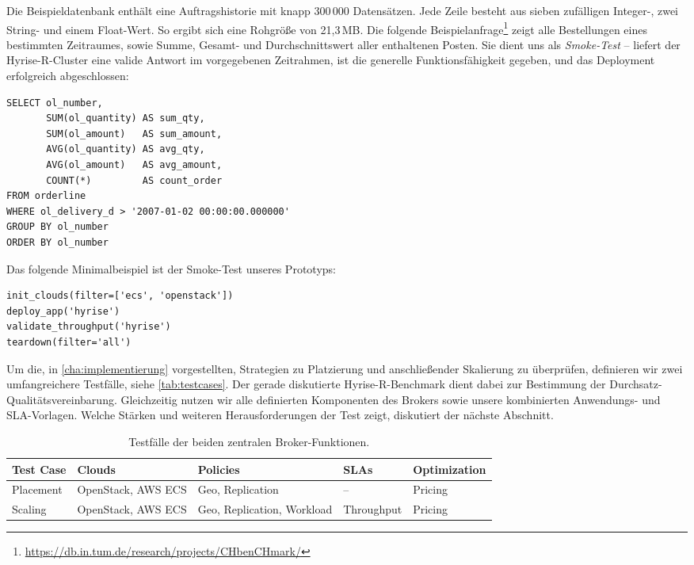 Die Beispieldatenbank enthält eine Auftragshistorie mit knapp 300\,000 Datensätzen. Jede Zeile besteht aus sieben zufälligen Integer-, zwei String- und einem Float-Wert. So ergibt sich eine Rohgröße von 21,3\,MB. Die folgende Beispielanfrage\footnote{\url{https://db.in.tum.de/research/projects/CHbenCHmark/}} zeigt alle Bestellungen eines bestimmten Zeitraumes, sowie Summe, Gesamt- und Durchschnittswert aller enthaltenen Posten. Sie dient uns als \emph{Smoke-Test} -- liefert der Hyrise-R-Cluster eine valide Antwort im vorgegebenen Zeitrahmen, ist die generelle Funktionsfähigkeit gegeben, und das Deployment erfolgreich abgeschlossen:

\begin{verbatim}
SELECT ol_number,
       SUM(ol_quantity) AS sum_qty,
       SUM(ol_amount)   AS sum_amount,
       AVG(ol_quantity) AS avg_qty,
       AVG(ol_amount)   AS avg_amount,
       COUNT(*)         AS count_order
FROM orderline 
WHERE ol_delivery_d > '2007-01-02 00:00:00.000000' 
GROUP BY ol_number
ORDER BY ol_number
\end{verbatim}


\noindent
Das folgende Minimalbeispiel ist der Smoke-Test unseres Prototyps:
\begin{verbatim}
init_clouds(filter=['ecs', 'openstack'])
deploy_app('hyrise')
validate_throughput('hyrise')
teardown(filter='all')
\end{verbatim}

\noindent
Um die, in \autoref{cha:implementierung} vorgestellten, Strategien zu Platzierung und anschließender Skalierung zu überprüfen, definieren wir zwei umfangreichere Testfälle, siehe \autoref{tab:testcases}. Der gerade diskutierte Hyrise-R-Benchmark dient dabei zur Bestimmung der Durchsatz-Qualitätsvereinbarung. Gleichzeitig nutzen wir alle definierten Komponenten des Brokers sowie unsere kombinierten Anwendungs- und SLA-Vorlagen.  Welche Stärken und weiteren Herausforderungen der Test zeigt, diskutiert der nächste Abschnitt.

\begin{table}[h!]
\centering%
%
\caption{Testfälle der beiden zentralen Broker-Funktionen.}%
\begin{tabularx}{\textwidth}{LLLLL}%
\toprule%
%
Test Case & Clouds & Policies & SLAs & Optimization\\%
%
\midrule%
%
Placement & OpenStack, AWS ECS & Geo, Replication & -- & Pricing\\%
Scaling   & OpenStack, AWS ECS & Geo, Replication, Workload & Throughput & Pricing\\%
\bottomrule%
\end{tabularx}
\label{tab:testcases}
\end{table}
